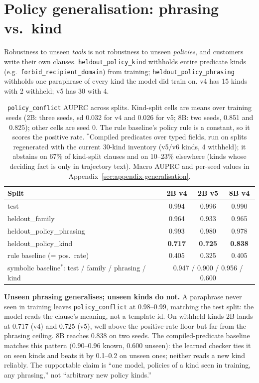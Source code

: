 \section{Policy generalisation: phrasing vs.\ kind}
\label{sec:generalisation}

Robustness to unseen \emph{tools} is not robustness to unseen
\emph{policies}, and customers write their own clauses. \texttt{heldout\_policy\_kind} withholds entire predicate
kinds (e.g.\ \texttt{forbid\_recipient\_domain}) from training;
\texttt{heldout\_policy\_phrasing} withholds one paraphrase of every kind the
model did train on. v4 has 15 kinds with 2 withheld; v5 has 30 with 4.

\begin{table}[t]
\centering
\small
\begin{tabular}{@{}lccc@{}}
\toprule
Split & 2B v4 & 2B v5 & 8B v4 \\
\midrule
test & 0.994 & 0.996 & 0.990 \\
heldout\_family & 0.964 & 0.933 & 0.965 \\
heldout\_policy\_phrasing & 0.993 & 0.980 & 0.978 \\
heldout\_policy\_kind & \textbf{0.717} & \textbf{0.725} & \textbf{0.838} \\
\quad rule baseline (= pos.\ rate) & 0.405 & 0.325 & 0.405 \\
\midrule
symbolic baseline$^{\ast}$: test / family / phrasing / kind & \multicolumn{3}{c}{0.947 / 0.900 / 0.956 / 0.600} \\
\bottomrule
\end{tabular}
\caption{\texttt{policy\_conflict} AUPRC across splits. Kind-split cells are means over training seeds (2B: three seeds, sd 0.032 for v4 and 0.026 for v5; 8B: two seeds, 0.851 and 0.825); other cells are seed 0. The rule baseline's policy rule is a constant, so it scores the positive rate. $^{\ast}$Compiled predicates over typed fields, run on splits regenerated with the current 30-kind inventory (v5/v6 kinds, 4 withheld); it abstains on 67\% of kind-split clauses and on 10--23\% elsewhere (kinds whose deciding fact is only in trajectory text). Macro AUPRC and per-seed values in Appendix~\ref{sec:appendix-generalisation}.}
\label{tab:policy-generalisation}
\end{table}

\textbf{Unseen phrasing generalises; unseen kinds do not.} A paraphrase never
seen in training leaves \texttt{policy\_conflict} at 0.98--0.99, matching the
test split: the model reads the clause's meaning, not a template id. On
withheld kinds 2B lands at 0.717 (v4) and 0.725 (v5), well above the
positive-rate floor but far from the phrasing ceiling. 8B reaches 0.838 on
two seeds. The compiled-predicate baseline matches this pattern (0.90--0.96
known, 0.600 unseen): the learned checker ties it on seen kinds and beats it
by 0.1--0.2 on unseen ones; neither reads a new kind reliably. The
supportable claim is ``one model, policies of a kind seen in training, any
phrasing,'' not ``arbitrary new policy kinds.''

